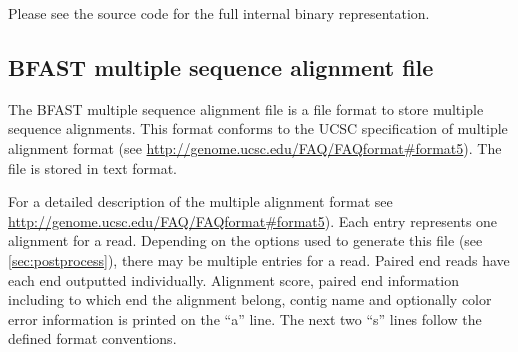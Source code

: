 \documentclass[a4paper,12pt]{book}
\newcommand{\QU}[1]{``#1''} %
\newcommand{\BMAF}{BFAST multiple sequence alignment file} %
\begin{document}
Please see the source code for the full internal binary representation.

\subsection{\BMAF{}}
\label{sec:bmaf}
The \BMAF{} is a file format to store multiple sequence alignments.
This format conforms to the UCSC specification of  multiple alignment format (see \url{http://genome.ucsc.edu/FAQ/FAQformat#format5}).
The file is stored in text format.

For a detailed description of the multiple alignment format see \url{http://genome.ucsc.edu/FAQ/FAQformat#format5}).
Each entry represents one alignment for a read. 
Depending on the options used to generate this file (see \autoref{sec:postprocess}), there may be multiple entries for a read.
Paired end reads have each end outputted individually.
Alignment score, paired end information including to which end the alignment belong, contig name and optionally color error information is printed on the \QU{a} line.
The next two \QU{s} lines follow the defined format conventions.
\end{document}
